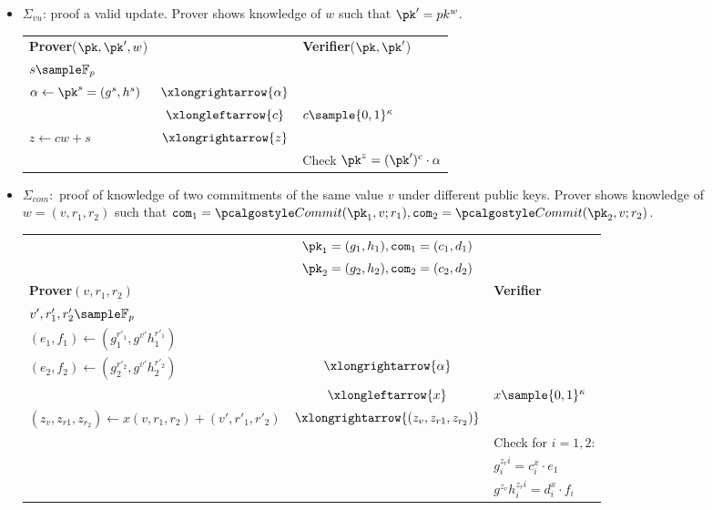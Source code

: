 \begin{itemize}
    \item $\Sigma_{vu}$: proof a valid update. Prover shows knowledge of $w$ such that $\pk' = pk^w$.

    \begin{center}
        \begin{tabular}{ |l c l| }
         \hline
         \textbf{Prover}($\pk, \pk', w$) &  & \textbf{Verifier}($\pk, \pk'$) \\
         $s \sample \mathbb{F}_p$ & & \\
         $\alpha \leftarrow \pk^s = (g^s, h^s)$ & $\xlongrightarrow{\alpha}$ & \\ 
         & $\xlongleftarrow{c}$ & $c \sample \{0,1\}^{\kappa}$ \\
         $z \leftarrow cw+s$ & $\xlongrightarrow{z}$ & \\
         & & Check $\pk^z =  (\pk')^c \cdot \alpha$ \\
         \hline
        \end{tabular}
    \end{center}

    \item $\Sigma_{com}:$ proof of knowledge of two commitments of the same value $v$ under different public keys. Prover shows knowledge of $w=(v,r_1,r_2)$ such that $\com_1 = \commit(\pk_1, v;r_1), \com_2 = \commit(\pk_2, v;r_2)$.

    \begin{center}
        \begin{tabular}{ |l c l| }
         \hline
         & $\pk_1 = (g_1, h_1), \com_1 = (c_1, d_1)$ & \\ 
         & $\pk_2 = (g_2, h_2), \com_2 = (c_2, d_2)$ & \\
         \textbf{Prover}$(v,r_1,r_2)$ &  & \textbf{Verifier} \\
         $v',r'_1,r'_2 \sample \mathbb{F}_p$ & & \\
         $(e_1,f_1) \leftarrow (g_1^{r'_1}, g^{v'}h_1^{r'_1})$ & & \\
         $(e_2,f_2) \leftarrow (g_2^{r'_2}, g^{v'}h_2^{r'_2})$ & $\xlongrightarrow{\alpha}$ & \\ 
         & $\xlongleftarrow{x}$ & $x \sample \{0,1\}^{\kappa}$ \\
         $(z_v, z_{r1}, z_{r_2}) \leftarrow x(v,r_1,r_2) + (v', r'_1, r'_2)$ & $\xlongrightarrow{(z_v, z_{r1}, z_{r_2})}$ & \\
         & & Check for $i = 1,2$:\\
         & & $g_i^{z_ri} = c_i^x \cdot e_1$\\
         & & $g^{z_v} h_i^{z_ri} = d_i^x \cdot f_i $ \\
         \hline
        \end{tabular}
    \end{center}

\end{itemize}

